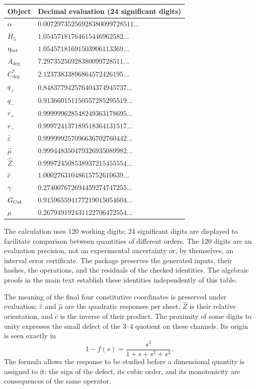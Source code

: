 \begin{longtable}{@{}ll@{}}
\toprule
Object & Decimal evaluation (24 significant digits)\\
\midrule\endhead
$\alpha$ & $0.00729735256928380099728511\ldots$ \\
$H_5$ & $1.05457181764615446962582\ldots$ \\
$\eta_{\rm ret}$ & $1.05457181691503906113369\ldots$ \\
$A_{\deg}$ & $7.29735256928380099728511\ldots$ \\
$C^*_{\deg}$ & $2.12373833896864572426195\ldots$ \\
$q_+$ & $0.848377942576404374945737\ldots$ \\
$q_-$ & $0.913660151150557285295519\ldots$ \\
$r_+$ & $0.999999628548249363178695\ldots$ \\
$r_-$ & $0.999724137189518364131517\ldots$ \\
$\widehat\varepsilon$ & $0.999999257096636702760442\ldots$ \\
$\widehat\mu$ & $0.999448350479326935089982\ldots$ \\
$\widehat Z$ & $0.999724508538937215455554\ldots$ \\
$\widehat c$ & $1.00027631048615752610639\ldots$ \\
$\gamma$ & $0.274007672694459274747255\ldots$ \\
$G_{\rm Cat}$ & $0.915965594177219015054604\ldots$ \\
$\rho$ & $0.267949192431122706472554\ldots$ \\
\bottomrule
\end{longtable}


The calculation uses 120 working digits; 24 significant
digits are displayed to facilitate comparison between quantities of different
orders. The 120 digits are an evaluation precision, not an experimental
uncertainty or, by themselves, an interval error certificate.
The package preserves the generated inputs, their hashes, the operations, and
the residuals of the checked identities. The algebraic proofs in the
main text establish these identities independently of this table.

The meaning of the final four constitutive coordinates is preserved
under evaluation: $\widehat\varepsilon$ and $\widehat\mu$ are the quadratic
responses per sheet, $\widehat Z$ is their relative orientation, and
$\widehat c$ is the inverse of their product. The proximity of some digits to
unity expresses the small defect of the $3$--$4$ quotient on these
channels. Its origin is seen exactly in
\[
 1-f(s)=\frac{s^3}{1+s+s^2+s^3}.
\]
The formula allows the response to be studied before a dimensional
quantity is assigned to it: the sign of the defect, its cubic order, and its monotonicity
are consequences of the same operator.

